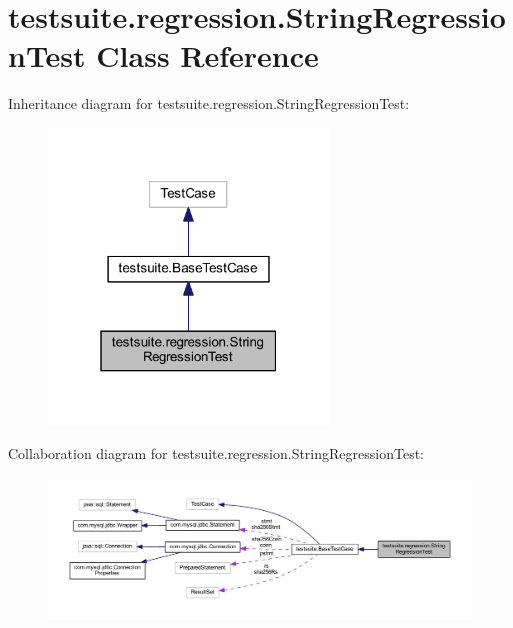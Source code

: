 \hypertarget{classtestsuite_1_1regression_1_1_string_regression_test}{}\section{testsuite.\+regression.\+String\+Regression\+Test Class Reference}
\label{classtestsuite_1_1regression_1_1_string_regression_test}


Inheritance diagram for testsuite.\+regression.\+String\+Regression\+Test\+:
\nopagebreak
\begin{figure}[H]
\begin{center}
\leavevmode
\includegraphics[width=211pt]{classtestsuite_1_1regression_1_1_string_regression_test__inherit__graph}
\end{center}
\end{figure}


Collaboration diagram for testsuite.\+regression.\+String\+Regression\+Test\+:
\nopagebreak
\begin{figure}[H]
\begin{center}
\leavevmode
\includegraphics[width=350pt]{classtestsuite_1_1regression_1_1_string_regression_test__coll__graph}
\end{center}
\end{figure}
